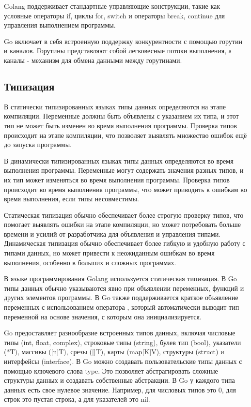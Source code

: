 Golang поддерживает стандартные управляющие конструкции, такие как условные операторы if, циклы for, switch и операторы break, continue для управления выполнением программы.

Go включает в себя встроенную поддержку конкурентности с помощью горутин и каналов.
Горутины представляют собой легковесные потоки выполнения, а каналы - механизм для обмена данными между горутинами.

\subsection*{Типизация}

В статически типизированных языках типы данных определяются на этапе компиляции.
Переменные должны быть объявлены с указанием их типа, и этот тип не может быть изменен во время выполнения программы.
Проверка типов происходит на этапе компиляции, что позволяет выявлять множество ошибок ещё до запуска программы.

В динамически типизированных языках типы данных определяются во время выполнения программы.
Переменные могут содержать значения разных типов, и их тип может изменяться во время выполнения программы.
Проверка типов происходит во время выполнения программы, что может приводить к ошибкам во время выполнения, если типы несовместимы.

Статическая типизация обычно обеспечивает более строгую проверку типов, что помогает выявлять ошибки на этапе компиляции, но может потребовать больше времени и усилий от разработчика для объявления и управления типами.
Динамическая типизация обычно обеспечивает более гибкую и удобную работу с типами данных, но может привести к неожиданным ошибкам во время выполнения, особенно в больших и сложных программах.


В языке программирования Golang используется статическая типизация.
В Go типы данных обычно указываются явно при объявлении переменных, функций и других элементов программы.
В Go также поддерживается краткое объявление переменных с использованием оператора \Code{:=}, который автоматически выводит тип переменной на основе значения, с которым она инициализируется.


Go предоставляет разнообразие встроенных типов данных, включая числовые типы (int, float, complex), строковые типы (string), булев тип (bool), указатели (*T), массивы ([n]T), срезы ([]T), карты (map[K]V), структуры (struct) и интерфейсы (interface{}).
В Go можно создавать пользовательские типы данных с помощью ключевого слова type.
Это позволяет абстрагировать сложные структуры данных и создавать собственные абстракции.
В Go у каждого типа данных есть свое нулевое значение.
Например, для числовых типов это 0, для строк это пустая строка, а для указателей это nil.

